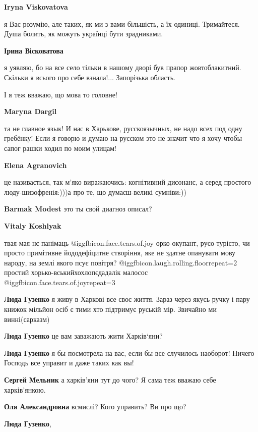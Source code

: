\begin{itemize}
\begin{itemize}
\textbf{Iryna Viskovatova} 

я Вас розумію, але таких, як ми з вами більшість, а їх одиниці. Тримайтеся.
Душа болить, як можуть українці бути зрадниками.

\textbf{Ірина Вісковатова} 

я уявляю, бо на все село тільки в нашому дворі був прапор жовтоблакитний.
Скільки я всього про себе взнала!... Запорізька область.

І я теж вважаю, що мова то головне!

\textbf{Maryna Dargil} 

та не главное язык! И нас в Харькове, русскоязычных, не надо всех под одну
гребёнку! Если я говорю и думаю на русском это не значит что я хочу чтобы сапог
рашки ходил по моим улицам!

\textbf{Elena Agranovich} 

це називається, так м'яко виражаючись: когнітивний дисонанс, а серед простого люду-шизофренія:)))а про те, що думаєш-великі сумніви:))

\textbf{Barmak Modest} это ты свой диагноз описал?

\textbf{Vitaly Koshlyak} 

твая-мая нє панімаць @igg{fbicon.face.tears.of.joy} орко-окупант, русо-турісто, чи просто примітивне
йододефіцитне створіння, яке не здатне опанувати мову народу, на землі якого псує
повітря?  @igg{fbicon.laugh.rolling.floor}{repeat=2} простий хорько-вськийхохлопєдадалік малосос @igg{fbicon.face.tears.of.joy}{repeat=3} 

\textbf{Люда Гузенко} я живу в Харкові все своє життя. Зараз через якусь ручку і пару книжок мільйон осіб є тими хто підтримує руській мір. Звичайно ми винні(сарказм)

\textbf{Люда Гузенко} це вам заважають жити Харків‘яни?

\textbf{Люда Гузенко} я бы посмотрела на вас, если бы все случилось наоборот! Ничего
Господь все управит и даже таких как вы!

\textbf{Сергей Мельник} а харків'яни тут до чого? Я сама теж вважаю себе харків'янкою.

\textbf{Оля Александровна} всмислі? Кого управить? Ви про що?

\textbf{Люда Гузенко}, 


\end{itemize}
\end{itemize}
